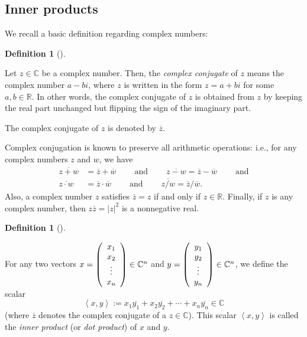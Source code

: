 \documentclass[numbers=enddot,12pt,final,onecolumn,notitlepage]{scrartcl}%
\numberwithin{exer}{subsection}
\theoremstyle{definition}
\newtheorem{defi}[theo]{Definition}
\newenvironment{definition}[1][]
{\begin{defi}[#1]\begin{leftbar}}
{\end{leftbar}\end{defi}}
\begin{document}
\subsection{Inner products}

We recall a basic definition regarding complex numbers:

\begin{definition}
Let $z\in\mathbb{C}$ be a complex number. Then, the \emph{complex conjugate}
of $z$ means the complex number $a-bi$, where $z$ is written in the form
$z=a+bi$ for some $a,b\in\mathbb{R}$. In other words, the complex conjugate of
$z$ is obtained from $z$ by keeping the real part unchanged but flipping the
sign of the imaginary part.

The complex conjugate of $z$ is denoted by $\overline{z}$.
\end{definition}

Complex conjugation is known to preserve all arithmetic operations: i.e., for
any complex numbers $z$ and $w$, we have%
\begin{align*}
\overline{z+w}  &  =\overline{z}+\overline{w}\ \ \ \ \ \ \ \ \ \ \text{and}%
\ \ \ \ \ \ \ \ \ \ \overline{z-w}=\overline{z}-\overline{w}%
\ \ \ \ \ \ \ \ \ \ \text{and}\\
\overline{z\cdot w}  &  =\overline{z}\cdot\overline{w}%
\ \ \ \ \ \ \ \ \ \ \text{and}\ \ \ \ \ \ \ \ \ \ \overline{z/w}=\overline
{z}/\overline{w}.
\end{align*}
Also, a complex number $z$ satisfies $\overline{z}=z$ if and only if
$z\in\mathbb{R}$. Finally, if $z$ is any complex number, then $z\overline
{z}=\left\vert z\right\vert ^{2}$ is a nonnegative real.

\begin{definition}
\label{def.unitary.innerprod.innerprod}For any two vectors $x=\left(
\begin{array}
[c]{c}%
x_{1}\\
x_{2}\\
\vdots\\
x_{n}%
\end{array}
\right)  \in\mathbb{C}^{n}$ and $y=\left(
\begin{array}
[c]{c}%
y_{1}\\
y_{2}\\
\vdots\\
y_{n}%
\end{array}
\right)  \in\mathbb{C}^{n}$, we define the scalar%
\begin{equation}
\left\langle x,y\right\rangle :=x_{1}\overline{y_{1}}+x_{2}\overline{y_{2}%
}+\cdots+x_{n}\overline{y_{n}}\in\mathbb{C}
\label{eq.def.unitary.innerprod.innerprod.def}%
\end{equation}
(where $\overline{z}$ denotes the complex conjugate of a $z\in\mathbb{C}$).
This scalar $\left\langle x,y\right\rangle $ is called the \emph{inner
product} (or \emph{dot product}) of $x$ and $y$.
\end{definition}
\end{document}

